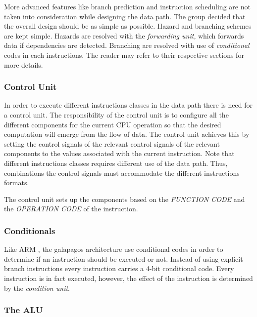 More advanced features like branch prediction and instruction scheduling are not taken into consideration while designing the data path. The group decided that the overall design should be as simple as possible. Hazard and branching schemes are kept simple. Hazards are resolved with the \emph{forwarding unit}, which forwards data if dependencies are detected. Branching are resolved with use of \emph{conditional} codes in each instructions. The reader may refer to their respective sections for more details.



\subsubsection{Control Unit} \label{fpga:fitness:sss:control_unit}
In order to execute different instructions classes in the data path there is need for a control unit. The responsibility of the control unit is to configure all the different components for the current CPU operation so that the desired computation will emerge from the flow of data. The control unit achieves this by setting the control signals of the relevant control signals of the relevant components to the values associated with the current instruction. Note that different instructions classes requires different use of the data path. Thus, combinations the control signals must accommodate the different instructions formats. 


The control unit sets up the components based on the \emph{FUNCTION CODE} and the \emph{OPERATION CODE} of the instruction. 



    



\subsubsection{Conditionals} \label{fpga:fitness:sss:conditionals}
Like ARM , the galapagos architecture use conditional codes in order to determine if an instruction should be executed or not. Instead of using explicit branch instructions every instruction carries a 4-bit conditional code. Every instruction is in fact executed, however, the effect of the instruction is determined by the \emph{condition unit}. 


\subsubsection{The ALU}\label{fpga:fitness:sss:the_alu}

